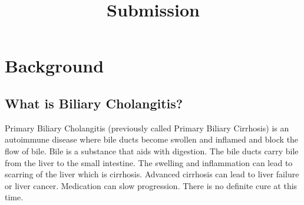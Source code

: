 \documentclass[
]{article}
\title{Submission}
\author{}
\date{\vspace{-2.5em}}
\begin{document}
\maketitle

{
\setcounter{tocdepth}{2}
\tableofcontents
}
\hypertarget{background}{%
\section{Background}\label{background}}

\hypertarget{what-is-biliary-cholangitis}{%
\subsection{What is Biliary
Cholangitis?}\label{what-is-biliary-cholangitis}}

Primary Biliary Cholangitis (previously called Primary Biliary
Cirrhosis) is an autoimmune disease where bile ducts become swollen and
inflamed and block the flow of bile. Bile is a substance that aids with
digestion. The bile ducts carry bile from the liver to the small
intestine. The swelling and inflammation can lead to scarring of the
liver which is cirrhosis. Advanced cirrhosis can lead to liver failure
or liver cancer. Medication can slow progression. There is no definite
cure at this time.
\end{document}
